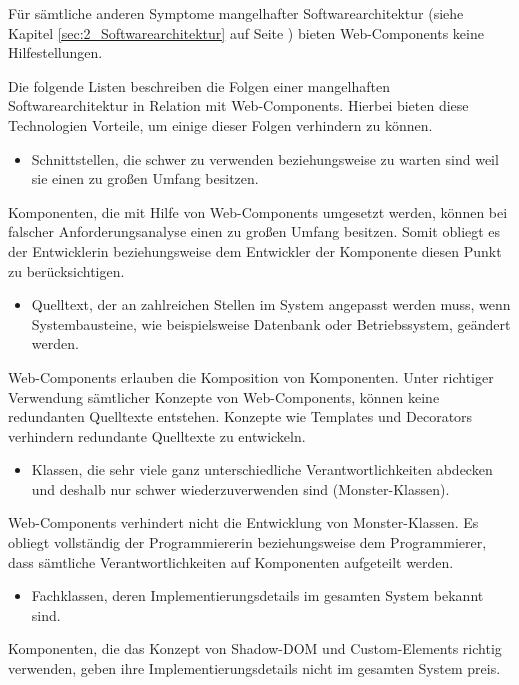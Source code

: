 Für sämtliche anderen Symptome mangelhafter Softwarearchitektur (siehe Kapitel \ref{sec:2_Softwarearchitektur} auf Seite \pageref{sec:2_Softwarearchitektur}) bieten Web-Components keine Hilfestellungen.

Die folgende Listen beschreiben die Folgen einer mangelhaften Softwarearchitektur in Relation mit Web-Components. Hierbei bieten diese Technologien Vorteile, um einige dieser Folgen verhindern zu können.

\begin{itemize}
\item Schnittstellen, die schwer zu verwenden beziehungsweise zu warten sind weil sie einen zu großen Umfang besitzen.
\end{itemize}
Komponenten, die mit Hilfe von Web-Components umgesetzt werden, können bei falscher Anforderungsanalyse einen zu großen Umfang besitzen. Somit obliegt es der Entwicklerin beziehungsweise dem Entwickler der Komponente diesen Punkt zu berücksichtigen.

\begin{itemize}
\item Quelltext, der an zahlreichen Stellen im System angepasst werden muss, wenn Systembausteine, wie beispielsweise Datenbank oder Betriebssystem, geändert werden.
\end{itemize}
Web-Components erlauben die Komposition von Komponenten. Unter richtiger Verwendung sämtlicher Konzepte von Web-Components, können keine redundanten Quelltexte entstehen. Konzepte wie Templates und Decorators verhindern redundante Quelltexte zu entwickeln.

\begin{itemize}
\item Klassen, die sehr viele ganz unterschiedliche Verantwortlichkeiten abdecken und deshalb nur schwer wiederzuverwenden sind (\glqq Monster\grqq -Klassen).
\end{itemize}
Web-Components verhindert nicht die Entwicklung von \glqq Monster\grqq -Klassen. Es obliegt vollständig der Programmiererin beziehungsweise dem Programmierer, dass sämtliche Verantwortlichkeiten auf Komponenten aufgeteilt werden.

\begin{itemize}
\item Fachklassen, deren Implementierungsdetails im gesamten System bekannt sind.
\end{itemize}
Komponenten, die das Konzept von Shadow-DOM und Custom-Elements richtig verwenden, geben ihre Implementierungsdetails nicht im gesamten System preis.
